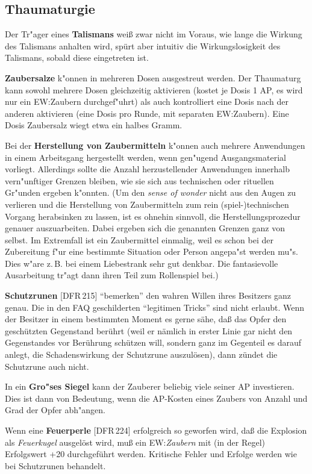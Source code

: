 \documentclass[10pt,a4paper,germanpar]{article}
\begin{document}
\subsection{Thaumaturgie}

Der Tr"ager eines \textbf{Talismans} weiß zwar nicht im Voraus, wie
lange die Wirkung des Talismans anhalten wird, spürt aber intuitiv die
Wirkungslosigkeit des Talismans, sobald diese eingetreten ist.

\textbf{Zaubersalze} k"onnen in mehreren Dosen ausgestreut werden. Der
Thaumaturg kann sowohl mehrere Dosen gleichzeitig aktivieren (kostet
je Dosis 1 AP, es wird nur ein EW:Zaubern durchgef"uhrt) als auch
kontrolliert eine Dosis nach der anderen aktivieren (eine Dosis pro
Runde, mit separaten EW:Zaubern). Eine Dosis Zaubersalz wiegt etwa ein
halbes Gramm.

Bei der \textbf{Herstellung von Zaubermitteln} k"onnen auch mehrere
Anwendungen in einem Arbeitsgang hergestellt werden, wenn gen"ugend
Ausgangsmaterial vorliegt. Allerdings sollte die Anzahl
herzustellender Anwendungen innerhalb vern"unftiger Grenzen bleiben,
wie sie sich aus technischen oder rituellen Gr"unden ergeben k"onnten.
(Um den \emph{sense of wonder} nicht aus den Augen zu verlieren und
die Herstellung von Zaubermitteln zum rein (spiel-)technischen Vorgang
herabsinken zu lassen, ist es ohnehin sinnvoll, die
Herstellungsprozedur genauer auszuarbeiten. Dabei ergeben sich die
genannten Grenzen ganz von selbst. Im Extremfall ist ein Zaubermittel
einmalig, weil es schon bei der Zubereitung f"ur eine bestimmte
Situation oder Person angepa"st werden mu"s. Dies w"are z.\,B. bei einem
Liebestrank sehr gut denkbar. Die fantasievolle Ausarbeitung tr"agt
dann ihren Teil zum Rollenspiel bei.)

\textbf{Schutzrunen} [DFR\,215] "`bemerken"' den wahren Willen ihres
Besitzers ganz genau. Die in den FAQ geschilderten "`legitimen
Tricks"' sind nicht erlaubt. Wenn der Besitzer in einem bestimmten
Moment es gerne sähe, daß das Opfer den geschützten Gegenstand berührt
(weil er nämlich in erster Linie gar nicht den Gegenstandes vor
Berührung schützen will, sondern ganz im Gegenteil es darauf anlegt,
die Schadenswirkung der Schutzrune auszulösen), dann zündet die
Schutzrune auch nicht.

In ein \textbf{Gro"ses Siegel} kann der Zauberer beliebig viele seiner
AP investieren. Dies ist dann von Bedeutung, wenn die AP-Kosten eines
Zaubers von Anzahl und Grad der Opfer abh"angen.

Wenn eine \textbf{Feuerperle} [DFR\,224] erfolgreich so geworfen wird,
daß die Explosion als \emph{Feuerkugel} ausgelöst wird, muß ein
EW:\emph{Zaubern} mit (in der Regel) Erfolgswert +20 durchgeführt
werden. Kritische Fehler und Erfolge werden wie bei Schutzrunen
behandelt.
\end{document}

